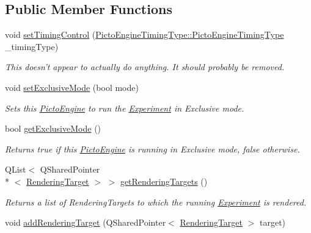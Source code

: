\subsection*{Public Member Functions}
\begin{DoxyCompactItemize}
\item 
void \hyperlink{class_picto_1_1_engine_1_1_picto_engine_ab823d923ede27e2788fefa0361004a53}{set\-Timing\-Control} (\hyperlink{namespace_picto_1_1_engine_1_1_picto_engine_timing_type_a3b9833c69033de872a089c4c79a7496c}{Picto\-Engine\-Timing\-Type\-::\-Picto\-Engine\-Timing\-Type} \-\_\-timing\-Type)
\begin{DoxyCompactList}\small\item\em This doesn't appear to actually do anything. It should probably be removed. \end{DoxyCompactList}\item 
void \hyperlink{class_picto_1_1_engine_1_1_picto_engine_aef1a0c0744aaaa908ca1fe3bbc842f48}{set\-Exclusive\-Mode} (bool mode)
\begin{DoxyCompactList}\small\item\em Sets this \hyperlink{class_picto_1_1_engine_1_1_picto_engine}{Picto\-Engine} to run the \hyperlink{class_picto_1_1_experiment}{Experiment} in Exclusive mode. \end{DoxyCompactList}\item 
bool \hyperlink{class_picto_1_1_engine_1_1_picto_engine_a046e3d64216d1a8ce55ed52f37b776fa}{get\-Exclusive\-Mode} ()
\begin{DoxyCompactList}\small\item\em Returns true if this \hyperlink{class_picto_1_1_engine_1_1_picto_engine}{Picto\-Engine} is running in Exclusive mode, false otherwise. \end{DoxyCompactList}\item 
\hypertarget{class_picto_1_1_engine_1_1_picto_engine_af580f59dbd4c5639d024a6973569c18c}{Q\-List$<$ Q\-Shared\-Pointer\\*
$<$ \hyperlink{struct_picto_1_1_rendering_target}{Rendering\-Target} $>$ $>$ \hyperlink{class_picto_1_1_engine_1_1_picto_engine_af580f59dbd4c5639d024a6973569c18c}{get\-Rendering\-Targets} ()}\label{class_picto_1_1_engine_1_1_picto_engine_af580f59dbd4c5639d024a6973569c18c}

\begin{DoxyCompactList}\small\item\em Returns a list of Rendering\-Targets to which the running \hyperlink{class_picto_1_1_experiment}{Experiment} is rendered. \end{DoxyCompactList}\item 
\hypertarget{class_picto_1_1_engine_1_1_picto_engine_af39f27e8d5a6fd4e173c1b5f372dc788}{void \hyperlink{class_picto_1_1_engine_1_1_picto_engine_af39f27e8d5a6fd4e173c1b5f372dc788}{add\-Rendering\-Target} (Q\-Shared\-Pointer$<$ \hyperlink{struct_picto_1_1_rendering_target}{Rendering\-Target} $>$ target)}\label{class_picto_1_1_engine_1_1_picto_engine_af39f27e8d5a6fd4e173c1b5f372dc788}


\end{DoxyCompactItemize}
